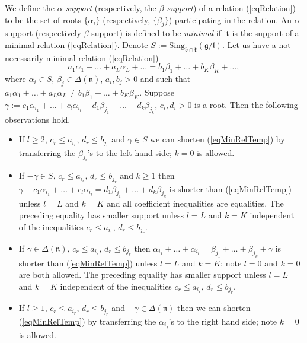 \documentclass[12pt]{report}
\newcommand{\kk}{\mathfrak{k}}
\newcommand{\nn}{\mathfrak{n}}
\newcommand{\gG}{\mathfrak{g}}
\newcommand{\bb}{\mathfrak{b}}
\newcommand{\lL}{\mathfrak{l}}
\newcommand{\refeq}[1]{(\ref{#1})}
\newcommand{\hw}{\mathrm{Sing}}
\begin{document}
We define the \emph{$\alpha$-support} (respectively, the \emph{$\beta$-support}) of a relation \refeq{eqRelation} to be the set of roots $\{\alpha_i\}$ (respectively, $\{\beta_j\}$) participating in the relation. An $\alpha$-support (respectively $\beta$-support) is defined to be \emph{minimal} if it is the support of a minimal relation (\ref{eqRelation}). Denote $S:=\hw_{\bb\cap\kk}(\gG/\lL)$. Let us have a not necessarily minimal relation \refeq{eqRelation}
\begin{equation}\label{eqMinRelTemp}
a_1\alpha_{1}+\dots+a_L\alpha_L+\dots = b_1\beta_1+\dots+b_K\beta_K+\dots,
\end{equation}
where $\alpha_i\in S$, $\beta_j\in\Delta(\nn)$, $a_i,b_j>0$ and such that $a_1\alpha_{1}+\dots+a_L\alpha_L\neq b_1\beta_1+\dots+b_K\beta_K$. Suppose $\gamma:=c_1\alpha_{i_1}+\dots+ c_l\alpha_{i_l} -d_1\beta_{j_1} -\dots - d_k\beta_{j_k}$, $c_i,d_i>0$ is a root.
Then the following observations hold.
\begin{itemize}
\item If $l\geq 2$, $c_r\leq a_{i_r}$, $d_r\leq b_{j_r}$ and $\gamma\in S$ we can shorten \refeq{eqMinRelTemp} by transferring the $\beta_{j_i}$'s to the left hand side; $k=0$ is allowed.
\item If $-\gamma\in S$, $c_r\leq a_{i_r}$, $d_r\leq b_{j_r}$ and $k\geq 1$ then $\gamma+c_1\alpha_{i_1}+ \dots+c_l\alpha_{i_l}= d_1\beta_{j_1}+ \dots +d_k \beta_{j_k}$ is shorter than \refeq{eqMinRelTemp} unless $l=L$ and $k=K$ and all coefficient inequalities are equalities. The preceding equality has smaller support unless $l=L$ and $k=K$ independent of the inequalities $c_r\leq a_{i_r}$, $d_r\leq b_{j_r}$.
\item If $\gamma\in \Delta(\nn)$, $c_r\leq a_{i_r}$, $d_r\leq b_{j_r}$ then $\alpha_{i_1}+\dots+ \alpha_{i_l}= \beta_{j_1} +\dots + \beta_{j_k}+\gamma$ is shorter than \refeq{eqMinRelTemp} unless $l=L$ and $k=K$; note $l=0$ and $k=0$ are both allowed. The preceding equality has smaller support unless $l=L$ and $k=K$ independent of the inequalities $c_r\leq a_{i_r}$, $d_r\leq b_{j_r}$.
\item If $l\geq 1$, $c_r\leq a_{i_r}$, $d_r\leq b_{j_r}$ and $-\gamma\in \Delta(\nn)$ then we can shorten \refeq{eqMinRelTemp} by transferring the $\alpha_{i_j}$'s to the right hand side; note $k=0$ is allowed.
\end{itemize}
\end{document}
